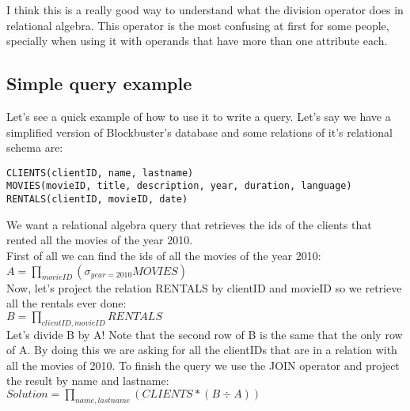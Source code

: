 \documentclass{article}
\begin{document}
\vskip 0.2in
I think this is a really good way to understand what the division operator does in relational algebra. This operator is the most confusing at first for some people, specially when using it with operands that have more than one attribute each.

\subsection*{Simple query example}

\vskip 0.2in
Let's see a quick example of how to use it to write a query. Let's say we have a simplified version of Blockbuster's database and some relations of it's relational schema are: 

\begin{lstlisting}
CLIENTS(clientID, name, lastname)
MOVIES(movieID, title, description, year, duration, language)
RENTALS(clientID, movieID, date)
\end{lstlisting}

We want a relational algebra query that retrieves the ids of the clients that rented all the movies of the year 2010. \\

First of all we can find the ids of all the movies of the year 2010:\\

$A = \prod_{movieID}(\sigma_{year = 2010}MOVIES)$ \\

Now, let's project the relation RENTALS by clientID and movieID so we retrieve all the rentals ever done: \\

$B = \prod_{clientID, movieID}RENTALS$ \\

Let's divide B by A! Note that the second row of B is the same that the only row of A. By doing this we are asking for all the clientIDs that are in a relation with all the movies of 2010. To finish the query we use the JOIN operator and project the result by name and lastname: \\

$Solution = \prod_{name, lastname}(CLIENTS * (B \div A)) $
\end{document}
